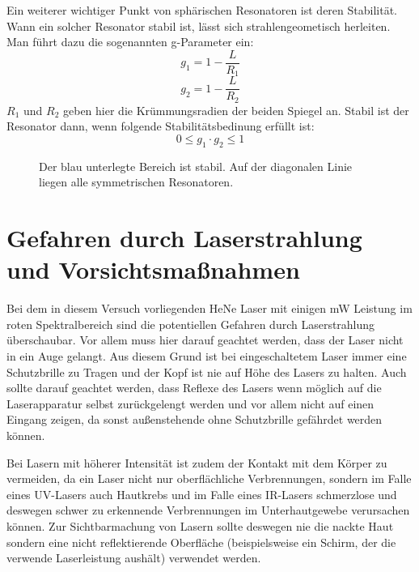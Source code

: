 \documentclass[bigchapter,colorback,accentcolor=tud4b,linedtoc,11pt]{tudreport}
\numberwithin{equation}{subsection}
\begin{document}
Ein weiterer wichtiger Punkt von sphärischen Resonatoren ist deren Stabilität. Wann ein solcher Resonator stabil ist, lässt sich strahlengeometisch herleiten. Man führt dazu die sogenannten g-Parameter ein:
$$g_1=1-\frac{L}{R_1}$$
$$g_2=1-\frac{L}{R_2}$$
$R_1$ und $R_2$ geben hier die Krümmungsradien der beiden Spiegel an. Stabil ist der Resonator dann, wenn folgende Stabilitätsbedinung erfüllt ist:
$$0\leq g_1 \cdot g_2 \leq 1$$


\begin{figure}[h]
\centering
	\caption{
		Der blau unterlegte Bereich ist stabil. Auf der diagonalen Linie liegen alle symmetrischen Resonatoren. 
	}
\end{figure}



\section{Gefahren durch Laserstrahlung und Vorsichtsmaßnahmen}
Bei dem in diesem Versuch vorliegenden HeNe Laser mit einigen mW Leistung im roten Spektralbereich sind die potentiellen Gefahren durch Laserstrahlung überschaubar. Vor allem muss hier darauf geachtet werden, dass der Laser nicht in ein Auge gelangt. Aus diesem Grund ist bei eingeschaltetem Laser immer eine Schutzbrille zu Tragen und der Kopf ist nie auf Höhe des Lasers zu halten. Auch sollte darauf geachtet werden, dass Reflexe des Lasers wenn möglich auf die Laserapparatur selbst zurückgelengt werden und vor allem nicht auf einen Eingang zeigen, da sonst außenstehende ohne Schutzbrille gefährdet werden können.

Bei Lasern mit höherer Intensität ist zudem der Kontakt mit dem Körper zu vermeiden, da ein Laser nicht nur oberflächliche Verbrennungen, sondern im Falle eines UV-Lasers auch Hautkrebs und im Falle eines IR-Lasers schmerzlose und deswegen schwer zu erkennende Verbrennungen im Unterhautgewebe verursachen können. Zur Sichtbarmachung von Lasern sollte deswegen nie die nackte Haut sondern eine nicht reflektierende Oberfläche (beispielsweise ein Schirm, der die verwende Laserleistung aushält) verwendet werden.
\end{document}

